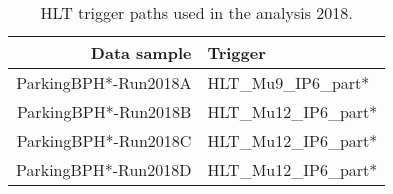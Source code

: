 \begin{table}[htb]
\caption{HLT trigger paths used in the analysis 2018.}
\begin{center}
\begin{tabular}{r|l}\hline
\hline
 Data sample & Trigger \\
\hline
 ParkingBPH*-Run2018A & HLT\_Mu9\_IP6\_part* \\
 \hline
 ParkingBPH*-Run2018B & HLT\_Mu12\_IP6\_part* \\
 ParkingBPH*-Run2018C & HLT\_Mu12\_IP6\_part* \\
 ParkingBPH*-Run2018D & HLT\_Mu12\_IP6\_part* \\
 \hline
 \hline
\end{tabular}
\label{tab:triggers18}
\end{center}
\end{table}


